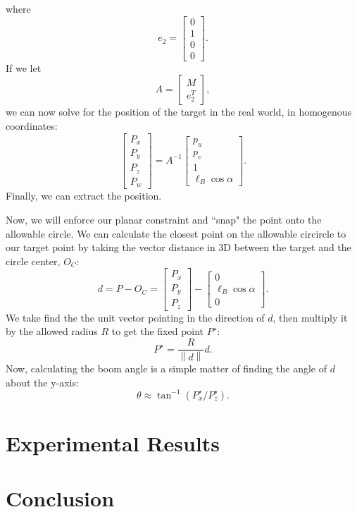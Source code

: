 \documentclass[letterpaper, 10 pt, conference]{ieeeconf}  %
\newcommand{\norm}[1]{\left\lVert #1 \right\rVert}
\begin{document}
where 
\[
e_2 = \left[\begin{array}{c}0 \\1 \\0 \\0\end{array}\right].
\]
If we let
\[
A = \left[\begin{array}{c}M \\e_2^T\end{array}\right], 
\]
we can now solve for the position of the target in the real world, in homogenous coordinates:
\[
\left[\begin{array}{c}P_x \\P_y \\P_z \\P_w\end{array}\right]=A^{-1}
\left[\begin{array}{c}p_u \\p_v \\1\\\ell_B\cos{\alpha}\end{array}\right].
\]
Finally, we can extract the position.

Now, we will enforce our planar constraint and ``snap" the point onto the allowable circle. We can calculate the closest point on the allowable circircle to our target point by taking the vector distance in 3D between the target and the circle center, $O_C$: 
\[
d = P - O_C = \left[\begin{array}{c}P_x \\P_y \\P_z \end{array}\right] - \left[\begin{array}{c}0 \\ \ell_B\cos{\alpha} \\ 0\end{array}\right].
\]
We take find the the unit vector pointing in the direction of $d$, then multiply it by the allowed radius $R$ to get the fixed point $P^\star$:
\[
P^\star = \frac{R}{\norm{d}}d.
\]
Now, calculating the boom angle is a simple matter of finding the angle of $d$ about the y-axis:
\[
\theta \approx \tan^{-1}\left({P^\star_x/P^\star_z}\right).
\]
\section{Experimental Results}

\section{Conclusion}

{}

\end{document}
